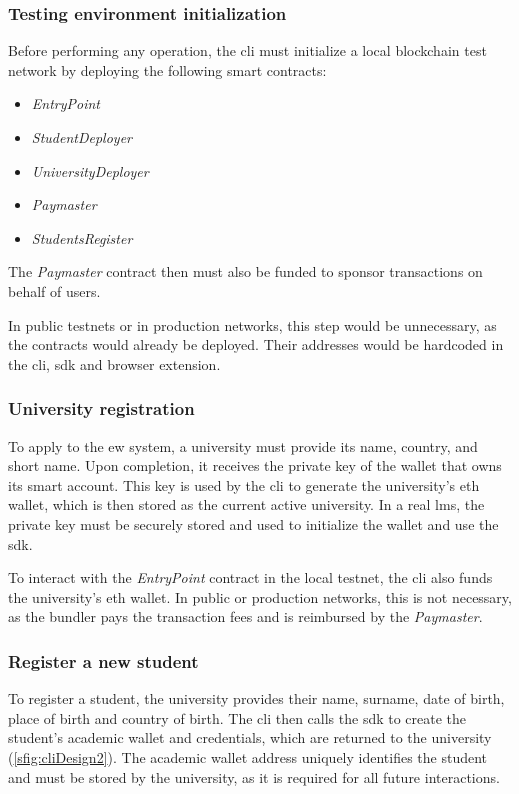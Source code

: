 \subsubsection{Testing environment initialization}
Before performing any operation, the \acrshort{cli} must initialize a local blockchain test network by deploying the following smart contracts:
\begin{itemize}
    \item \textit{EntryPoint}
    \item \textit{StudentDeployer}
    \item \textit{UniversityDeployer}
    \item \textit{Paymaster}
    \item \textit{StudentsRegister}
\end{itemize}
The \textit{Paymaster} contract then must also be funded to sponsor transactions on behalf of users.

In public testnets or in production networks, this step would be unnecessary, as the contracts would already be deployed. Their addresses would be hardcoded in the \acrshort{cli}, \acrshort{sdk} and browser extension.

\subsubsection{University registration}
\label{sssec:applyEw}
To apply to the \acrshort{ew} system, a university must provide its name, country, and short name. Upon completion, it receives the private key of the wallet that owns its smart account. This key is used by the \acrshort{cli} to generate the university's \acrlong{eth} wallet, which is then stored as the current active university. In a real \acrshort{lms}, the private key must be securely stored and used to initialize the wallet and use the \acrshort{sdk}. 

To interact with the \textit{EntryPoint}  contract in the local testnet, the \acrshort{cli} also funds the university's \acrshort{eth} wallet. In public or production networks, this is not necessary, as the bundler pays the transaction fees and is reimbursed by the \textit{Paymaster}.

\subsubsection{Register a new student}
To register a student, the  university provides their name, surname, date of birth, place of birth and country of birth. The \acrshort{cli} then calls the \acrshort{sdk} to create the student's academic wallet and credentials, which are returned to the university (\cref{sfig:cliDesign2}). The academic wallet address uniquely identifies the student and must be stored by the university, as it is required for all future interactions. 


